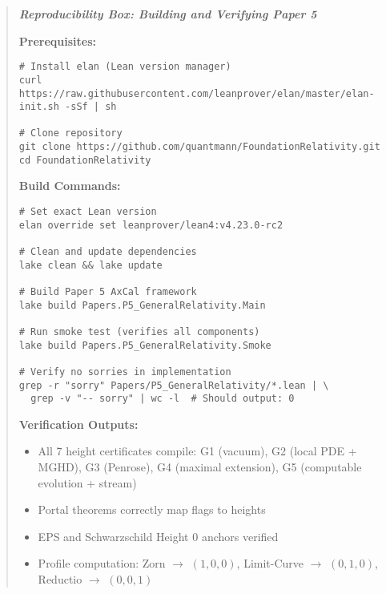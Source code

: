 \documentclass[11pt]{article}
\newenvironment{mdframed}[1][]{\begin{quote}\itshape}{\end{quote}}
\theoremstyle{definition}
\theoremstyle{remark}
\begin{document}
\begin{mdframed}[backgroundcolor=blue!5, linecolor=blue!30, linewidth=0.8pt]
\textbf{Reproducibility Box: Building and Verifying Paper 5}

\noindent\textbf{Prerequisites:}
\begin{verbatim}
# Install elan (Lean version manager)
curl https://raw.githubusercontent.com/leanprover/elan/master/elan-init.sh -sSf | sh

# Clone repository
git clone https://github.com/quantmann/FoundationRelativity.git
cd FoundationRelativity
\end{verbatim}

\noindent\textbf{Build Commands:}
\begin{verbatim}
# Set exact Lean version
elan override set leanprover/lean4:v4.23.0-rc2

# Clean and update dependencies
lake clean && lake update

# Build Paper 5 AxCal framework
lake build Papers.P5_GeneralRelativity.Main

# Run smoke test (verifies all components)
lake build Papers.P5_GeneralRelativity.Smoke

# Verify no sorries in implementation
grep -r "sorry" Papers/P5_GeneralRelativity/*.lean | \
  grep -v "-- sorry" | wc -l  # Should output: 0
\end{verbatim}

\noindent\textbf{Verification Outputs:}
\begin{itemize}
\item All 7 height certificates compile: G1 (vacuum), G2 (local PDE + MGHD), G3 (Penrose), G4 (maximal extension), G5 (computable evolution + stream)
\item Portal theorems correctly map flags to heights
\item EPS and Schwarzschild Height 0 anchors verified
\item Profile computation: Zorn $\to$ $(1,0,0)$, Limit-Curve $\to$ $(0,1,0)$, Reductio $\to$ $(0,0,1)$
\end{itemize}
\end{mdframed}

\end{document}

